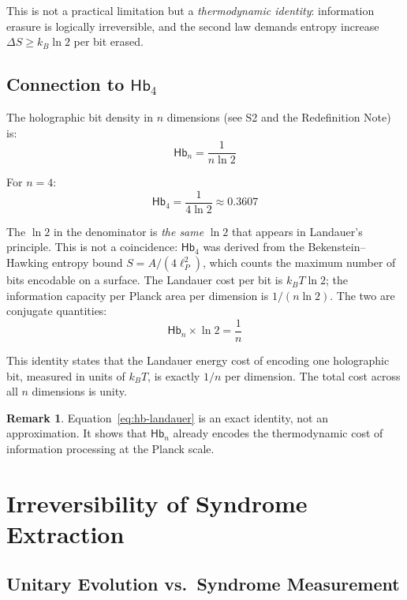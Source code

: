 \documentclass[11pt,a4paper]{article}
\theoremstyle{definition}
\newtheorem{remark}[theorem]{Remark}
\newcommand{\Hb}{\mathsf{Hb}}
\newcommand{\Hbn}{\Hb_n}
\newcommand{\Hbfour}{\Hb_4}
\begin{document}
This is not a practical limitation but a \emph{thermodynamic identity}: information erasure is logically irreversible, and the second law demands entropy increase $\Delta S \geq k_B \ln 2$ per bit erased.

\subsection{Connection to $\Hbfour$}

The holographic bit density in $n$ dimensions (see S2 and the Redefinition Note) is:
\begin{equation}
    \Hbn = \frac{1}{n \ln 2}
\end{equation}

For $n = 4$:
\begin{equation}
    \Hbfour = \frac{1}{4 \ln 2} \approx 0.3607
\end{equation}

The $\ln 2$ in the denominator is \emph{the same} $\ln 2$ that appears in Landauer's principle. This is not a coincidence: $\Hbfour$ was derived from the Bekenstein--Hawking entropy bound $S = A/(4\ell_P^2)$, which counts the maximum number of bits encodable on a surface. The Landauer cost per bit is $k_B T \ln 2$; the information capacity per Planck area per dimension is $1/(n \ln 2)$. The two are conjugate quantities:
\begin{equation}\label{eq:hb-landauer}
    \Hbn \times \ln 2 = \frac{1}{n}
\end{equation}

This identity states that the Landauer energy cost of encoding one holographic bit, measured in units of $k_B T$, is exactly $1/n$ per dimension. The total cost across all $n$ dimensions is unity.

\begin{remark}
Equation~\eqref{eq:hb-landauer} is an exact identity, not an approximation. It shows that $\Hbn$ already encodes the thermodynamic cost of information processing at the Planck scale.
\end{remark}


\section{Irreversibility of Syndrome Extraction}

\subsection{Unitary Evolution vs.\ Syndrome Measurement}
\end{document}
